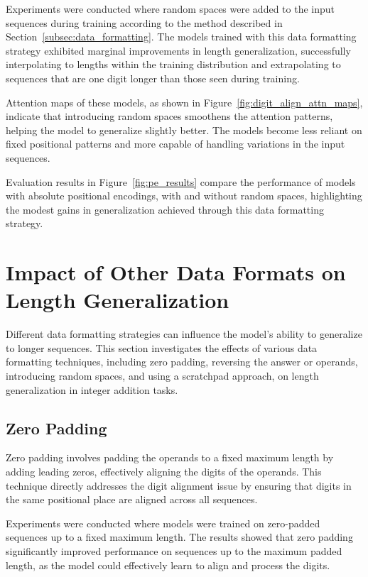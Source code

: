 Experiments were conducted where random spaces were added to the input sequences during training according to the method described in Section~\ref{subsec:data_formatting}. The models trained with this data formatting strategy exhibited marginal improvements in length generalization, successfully interpolating to lengths within the training distribution and extrapolating to sequences that are one digit longer than those seen during training.

Attention maps of these models, as shown in Figure~\ref{fig:digit_align_attn_maps}, indicate that introducing random spaces smoothens the attention patterns, helping the model to generalize slightly better. The models become less reliant on fixed positional patterns and more capable of handling variations in the input sequences.

Evaluation results in Figure~\ref{fig:pe_results} compare the performance of models with absolute positional encodings, with and without random spaces, highlighting the modest gains in generalization achieved through this data formatting strategy.


\section{Impact of Other Data Formats on Length Generalization}\label{sec:other_data_formats_length_generalization}

Different data formatting strategies can influence the model's ability to generalize to longer sequences. This section investigates the effects of various data formatting techniques, including zero padding, reversing the answer or operands, introducing random spaces, and using a scratchpad approach, on length generalization in integer addition tasks.

\subsection{Zero Padding}

Zero padding involves padding the operands to a fixed maximum length by adding leading zeros, effectively aligning the digits of the operands. This technique directly addresses the digit alignment issue by ensuring that digits in the same positional place are aligned across all sequences.

Experiments were conducted where models were trained on zero-padded sequences up to a fixed maximum length. The results showed that zero padding significantly improved performance on sequences up to the maximum padded length, as the model could effectively learn to align and process the digits.

